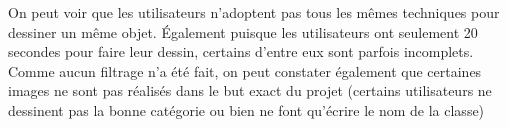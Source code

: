 On peut voir que les utilisateurs n'adoptent pas tous les mêmes techniques pour dessiner un même objet. Également puisque les utilisateurs ont seulement 20 secondes pour faire leur dessin, certains d'entre eux sont parfois incomplets. Comme aucun filtrage n'a été fait, on peut constater également que certaines images ne sont pas réalisés dans le but exact du projet (certains utilisateurs ne dessinent pas la bonne catégorie ou bien ne font qu'écrire le nom de la classe)
